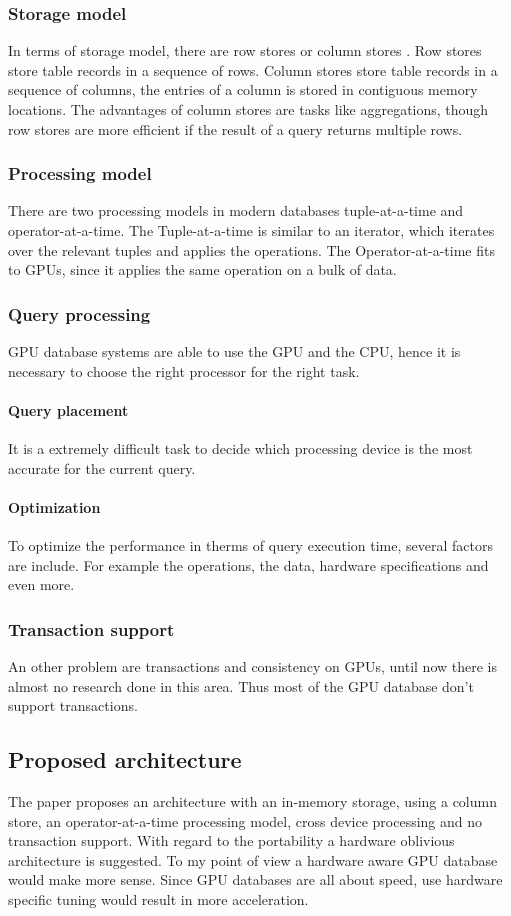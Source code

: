 \subsubsection{Storage model}
In terms of storage model, there are row stores or column stores \cite{abadi2008column}.
Row stores store table records in a sequence of rows.
Column stores store table records in a sequence of columns, the entries of a column is stored in contiguous memory locations.
The advantages of column stores are tasks like aggregations, though row stores are more efficient if the result of a query returns multiple rows.


\subsubsection{Processing model}
There are two processing models in modern databases tuple-at-a-time and operator-at-a-time.
The Tuple-at-a-time is similar to an iterator, which iterates over the relevant tuples and applies the operations.
The Operator-at-a-time fits to GPUs, since it applies the same operation on a bulk of data.

\subsubsection{Query processing}
GPU database systems are able to use the GPU and the CPU, hence it is necessary to choose the right processor for the right task.
\paragraph{Query placement} It is a extremely difficult task to decide which processing device is the most accurate for the current query.
\paragraph{Optimization} To optimize the performance in therms of query execution time, several factors are include.
For example the operations, the data, hardware specifications and even more.

\subsubsection{Transaction support}
An other problem are transactions and consistency on GPUs, until now there is almost no research done in this area.
Thus most of the GPU database don't support transactions.


\subsection{Proposed architecture}
The paper \cite{bress2014gpu} proposes an architecture with an in-memory storage, using a column store, an operator-at-a-time processing model, cross device processing and no transaction support.
With regard to the portability a hardware oblivious architecture is suggested.
To my point of view a hardware aware GPU database would make more sense.
Since GPU databases are all about speed, use hardware specific tuning would result in more acceleration.